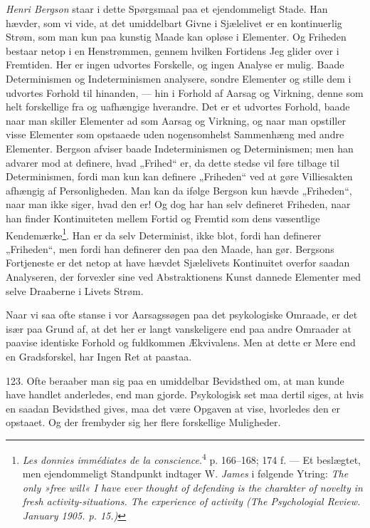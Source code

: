 \documentclass[12pt,a4paper]{book}
\newcommand{\opage}[1]{\marginnote{\footnotesize\textit{[#1]}}}
\begin{document}
\emph{Henri Bergson} staar i dette Spørgsmaal paa et ejendommeligt Stade. Han hævder,
som vi vide, at det umiddelbart Givne i Sjælelivet er en kontinuerlig Strøm, som man
kun paa kunstig Maade kan opløse i Elementer. Og Friheden bestaar netop i en
Henstrømmen, gennem hvilken Fortidens Jeg glider over i Fremtiden. Her er ingen
udvortes Forskelle, og ingen Analyse er mulig. Baade Determinismen og Indeterminismen
analysere, sondre Elementer og stille dem i udvortes Forhold til hinanden, --- hin i
Forhold af Aarsag og Virkning, denne som helt forskellige fra og uafhængige
hverandre. Det er et udvortes Forhold, baade naar man skiller Elementer ad som Aarsag
og Virkning, og naar man opstiller visse Elementer som opstaaede uden nogensomhelst
Sammenhæng med andre Elementer. Bergson afviser baade Indeterminismen og
Determinismen; men han advarer mod at definere, hvad „Frihed“ er, da dette stedse vil
føre tilbage til Determinismen, fordi man kun kan definere „Friheden“ ved at gøre
Villiesakten afhængig af Personligheden. Man kan da ifølge Bergson kun hævde „Fri\opage{293}heden“, naar man ikke siger, hvad den er! Og dog har han selv defineret Friheden,
naar han finder Kontinuiteten mellem Fortid og Fremtid som dens væsentlige
Kendemærke\footnote{\emph{Les donnies immédiates de la conscience}.\textsuperscript{4}
p. 166--168; 174 f. --- Et beslægtet, men ejendommeligt Standpunkt indtager W.
\emph{James} i følgende Ytring: \emph{The only »free will« I have ever thought of
defending is the charakter of novelty in fresh activity-situations. The experience of
activity (The Psychologial Review. January 1905. p. 15.)}}. Han er da selv
Determinist, ikke blot, fordi han definerer „Friheden“, men fordi han definerer den
paa den Maade, han gør. Bergsons Fortjeneste er det netop at have hævdet Sjælelivets
Kontinuitet overfor saadan Analyseren, der forvexler sine ved Abstraktionens Kunst
dannede Elementer med selve Draaberne i Livets Strøm.

Naar vi saa ofte stanse i vor Aarsagssøgen paa det psykologiske Omraade, er det især
paa Grund af, at det her er langt vanskeligere end paa andre Omraader at paavise
identiske Forhold og fuldkommen Ækvivalens. Men at dette er Mere end en Gradsforskel,
har Ingen Ret at paastaa.

123. Ofte beraaber man sig paa en umiddelbar Bevidsthed om, at man kunde have handlet
anderledes, end man gjorde. Psykologisk set maa dertil siges, at hvis en saadan
Bevidsthed gives, maa det være Opgaven at vise, hvorledes den er opstaaet. Og der
frembyder sig her flere forskellige Muligheder.
\end{document}
